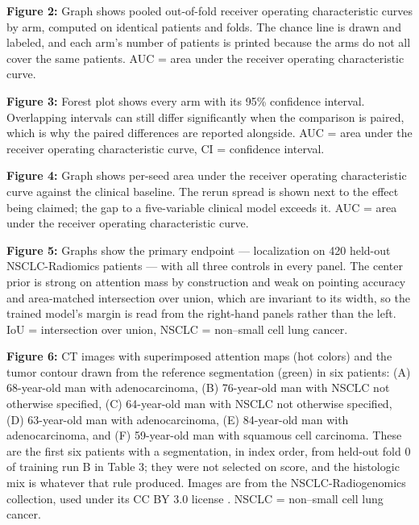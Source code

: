 \documentclass[11pt]{article}
\begin{document}
\textbf{Figure 2:} Graph shows pooled out-of-fold receiver operating
characteristic curves by arm, computed on identical patients and folds. The
chance line is drawn and labeled, and each arm's number of patients is printed
because the arms do not all cover the same patients.
AUC = area under the receiver operating characteristic curve.

\textbf{Figure 3:} Forest plot shows every arm with its 95\% confidence interval.
Overlapping intervals can still differ significantly when the comparison is
paired, which is why the paired differences are reported alongside.
AUC = area under the receiver operating characteristic curve,
CI = confidence interval.

\textbf{Figure 4:} Graph shows per-seed area under the receiver operating
characteristic curve against the clinical baseline. The rerun spread is shown next
to the effect being claimed; the gap to a five-variable clinical model exceeds it.
AUC = area under the receiver operating characteristic curve.

\textbf{Figure 5:} Graphs show the primary endpoint --- localization on 420
held-out NSCLC-Radiomics patients --- with all three controls in every panel. The
center prior is strong on attention mass by construction and weak on pointing
accuracy and area-matched intersection over union, which are invariant to its
width, so the trained model's margin is read from the right-hand panels rather
than the left. IoU = intersection over union,
NSCLC = non--small cell lung cancer.

\textbf{Figure 6:} CT images with superimposed attention maps (hot colors) and the
tumor contour drawn from the reference segmentation (green) in six patients:
(A) 68-year-old man with adenocarcinoma, (B) 76-year-old man with NSCLC not
otherwise specified, (C) 64-year-old man with NSCLC not otherwise specified,
(D) 63-year-old man with adenocarcinoma, (E) 84-year-old man with adenocarcinoma,
and (F) 59-year-old man with squamous cell carcinoma. These are the first six
patients with a segmentation, in index order, from held-out fold 0 of training run
B in Table 3; they were not selected on score, and the histologic mix is whatever
that rule produced. Images are from the NSCLC-Radiogenomics collection, used under
its CC BY 3.0 license \citep{bakr2018}.
NSCLC = non--small cell lung cancer.

\clearpage
\end{document}
